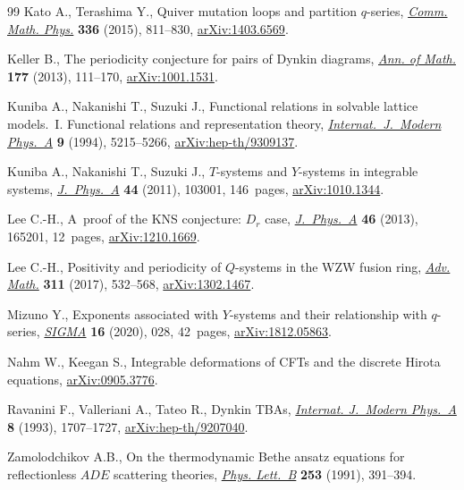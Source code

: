 \documentclass[pdftex]{sigma}
\numberwithin{equation}{section}
\begin{document}
\begin{thebibliography}{99}
Kato A., Terashima Y., Quiver mutation loops and partition {$q$}-series,
 \href{https://doi.org/10.1007/s00220-014-2224-5}{\textit{Comm. Math. Phys.}} \textbf{336} (2015), 811--830, \href{https://arxiv.org/abs/1403.6569}{arXiv:1403.6569}.

Keller B., The periodicity conjecture for pairs of {D}ynkin diagrams,
 \href{https://doi.org/10.4007/annals.2013.177.1.3}{\textit{Ann. of Math.}} \textbf{177} (2013), 111--170, \href{https://arxiv.org/abs/1001.1531}{arXiv:1001.1531}.

Kuniba A., Nakanishi T., Suzuki J., Functional relations in solvable lattice
 models.~{I}. {F}unctional relations and representation theory,
 \href{https://doi.org/10.1142/S0217751X94002119}{\textit{Internat.~J.~Modern Phys.~A}} \textbf{9} (1994), 5215--5266,
 \href{https://arxiv.org/abs/hep-th/9309137}{arXiv:hep-th/9309137}.

Kuniba A., Nakanishi T., Suzuki J., {$T$}-systems and {$Y$}-systems in
 integrable systems, \href{https://doi.org/10.1088/1751-8113/44/10/103001}{\textit{J.~Phys.~A}} \textbf{44} (2011), 103001,
 146~pages, \href{https://arxiv.org/abs/1010.1344}{arXiv:1010.1344}.

Lee C.-H., A~proof of the {KNS} conjecture: {$D_r$} case, \href{https://doi.org/10.1088/1751-8113/46/16/165201}{\textit{J.~Phys.~A}}
 \textbf{46} (2013), 165201, 12~pages, \href{https://arxiv.org/abs/1210.1669}{arXiv:1210.1669}.

Lee C.-H., Positivity and periodicity of {$Q$}-systems in the {WZW} fusion ring,
 \href{https://doi.org/10.1016/j.aim.2017.02.031}{\textit{Adv. Math.}} \textbf{311} (2017), 532--568, \href{https://arxiv.org/abs/1302.1467}{arXiv:1302.1467}.

Mizuno Y., Exponents associated with {$Y$}-systems and their relationship with
 {$q$}-series, \href{https://doi.org/10.3842/SIGMA.2020.028}{\textit{SIGMA}} \textbf{16} (2020), 028, 42~pages,
 \href{https://arxiv.org/abs/1812.05863}{arXiv:1812.05863}.

Nahm W., Keegan S., Integrable deformations of {CFT}s and the discrete {H}irota
 equations, \href{https://arxiv.org/abs/0905.3776}{arXiv:0905.3776}.

Ravanini F., Valleriani A., Tateo R., Dynkin {TBA}s, \href{https://doi.org/10.1142/S0217751X93000709}{\textit{Internat.
 J.~Modern Phys.~A}} \textbf{8} (1993), 1707--1727, \href{https://arxiv.org/abs/hep-th/9207040}{arXiv:hep-th/9207040}.

Zamolodchikov A.B., On the thermodynamic {B}ethe ansatz equations for
 reflectionless {$ADE$} scattering theories, \href{https://doi.org/10.1016/0370-2693(91)91737-G}{\textit{Phys. Lett.~B}}
 \textbf{253} (1991), 391--394.

\end{thebibliography}\LastPageEnding
\end{document}
